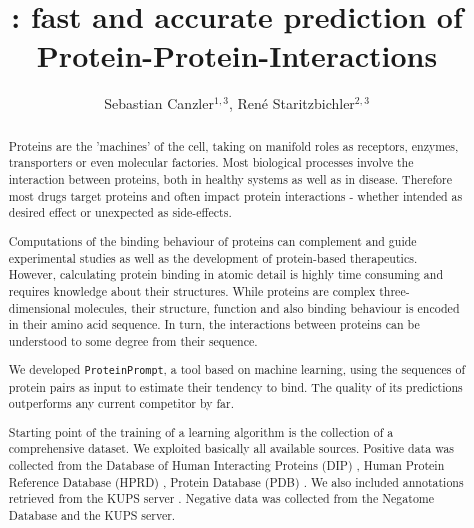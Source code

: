 \documentclass{article}
\title{\tool: fast and accurate prediction of Protein-Protein-Interactions}
\author{ Sebastian Canzler$^{1,3}$, Ren\'{e} Staritzbichler$^{2,3}$}
\date{}
\newcommand{\tool}{\texttt{ProteinPrompt}}
\begin{document}
\vspace{-1.5cm}

\maketitle

\vspace{-0.5cm}









\begin{samepage}

\begin{abstract}
  Proteins are the 'machines' of the cell, taking on manifold roles as receptors, enzymes, transporters or even molecular factories.
  Most biological processes involve the interaction between proteins, both in healthy systems as well as in disease.
  Therefore most drugs target proteins and often impact protein interactions - whether intended as desired effect or unexpected as side-effects.

  
  Computations of the binding behaviour of proteins can complement and guide experimental studies as well as the development of protein-based therapeutics.
  However, calculating protein binding in atomic detail is highly time consuming and requires  knowledge about their structures.
  While proteins are complex three-dimensional molecules, their structure, function and also binding behaviour is encoded in their amino acid sequence.
  In turn, the interactions between proteins can be understood to some degree from their sequence.
  
  We developed \tool, a tool based on machine learning, using the sequences of protein pairs as input to estimate their tendency to bind.
  The quality of its predictions outperforms any current competitor by far.
  
  Starting point of the training of a learning algorithm is the collection of a comprehensive dataset. We exploited basically all available sources.
  Positive data was collected from the
  Database of Human Interacting Proteins (DIP)
  \cite{Salwinski:2004},
  Human Protein Reference Database (HPRD)
  \cite{Keshava_Prasad:2009},
  Protein  Database (PDB) \cite{Berman:2000}.
  We also included annotations retrieved from the
  KUPS server \cite{Chen:2011}.
  Negative data was collected
  from the Negatome Database \cite{Blohm:2014}  and the KUPS server.
  

\end{abstract}
\end{samepage}
\end{document}
